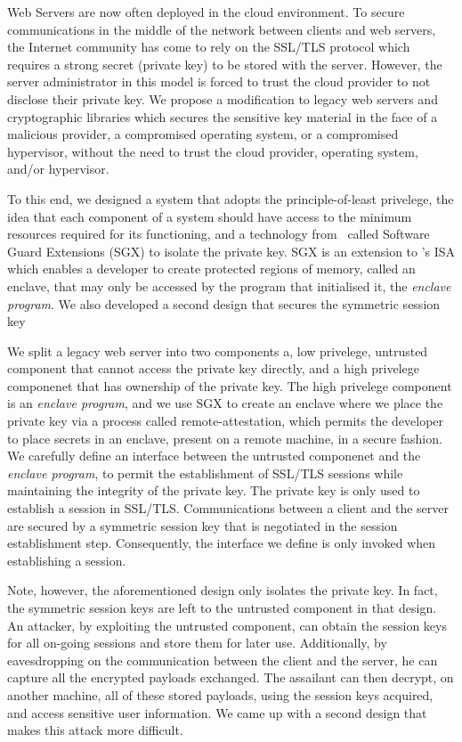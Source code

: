 \documentclass[../main.tex]{subfiles}
\begin{document}
   

Web Servers are now often deployed in the cloud environment. To secure
communications in the middle of the network between clients and web
servers, the Internet community has come to rely on the SSL/TLS
protocol which requires a strong secret (private key) to be stored
with the server. However, the server administrator in this model is
forced to trust the cloud provider to not disclose their private key.
We propose a modification to legacy web servers and cryptographic
libraries which secures the sensitive key material in the face of a
malicious provider, a compromised operating system, or a compromised
hypervisor, without the need to trust the cloud provider, operating
system, and/or hypervisor. 

To this end, we designed a system that adopts the principle-of-least
privelege, the idea that each component of a system should have access
to the minimum resources required for its functioning, and a
technology from \Intel~called Software Guard Extensions (SGX) to
isolate the private key. SGX is an extension to \Intel's ISA which
enables a developer to create protected regions of memory, called an
enclave, that may only be accessed by the program that initialised it,
the \textit{enclave program}. We also developed a second design
that secures the symmetric session key

We split a legacy web server into two components a, low privelege,
untrusted component that cannot access the private key directly, and a
high privelege componenet that has ownership of the private key. The
high privelege component is an \textit{enclave program}, and we use
SGX to create an enclave where we place the private key via a process
called remote-attestation, which permits the developer to place
secrets in an enclave, present on a remote machine, in a secure
fashion. We carefully define an interface between the untrusted
componenet and the \textit{enclave program}, to permit the
establishment of SSL/TLS sessions while maintaining the integrity of
the private key. The private key is only used to establish a session
in SSL/TLS. Communications between a client and the server are secured
by a symmetric session key that is negotiated in the session
establishment step. Consequently, the interface we define is only
invoked when establishing a session.

Note, however, the aforementioned design only isolates the private
key. In fact, the symmetric session keys are left to the untrusted
component in that design. An attacker, by exploiting the untrusted
component, can obtain the session keys for all on-going sessions and
store them for later use. Additionally, by eavesdropping on the
communication between the client and the server, he can capture all
the encrypted payloads exchanged. The assailant can then decrypt, on
another machine, all of these stored payloads, using the session keys
acquired, and access sensitive user information. We came up with a
second design that makes this attack more difficult.
\end{document}
